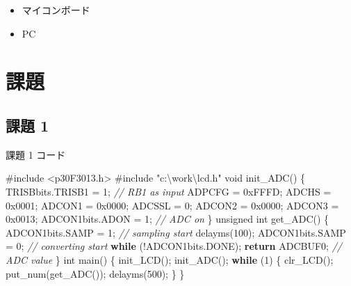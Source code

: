 \documentclass[9pt,a4paper,]{ltjsarticle}
\newenvironment{Shaded}{}{}
\newcommand{\BaseNTok}[1]{\textcolor[rgb]{0.25,0.63,0.44}{#1}}
\newcommand{\CommentTok}[1]{\textcolor[rgb]{0.38,0.63,0.69}{\textit{#1}}}
\newcommand{\ControlFlowTok}[1]{\textcolor[rgb]{0.00,0.44,0.13}{\textbf{#1}}}
\newcommand{\DataTypeTok}[1]{\textcolor[rgb]{0.56,0.13,0.00}{#1}}
\newcommand{\DecValTok}[1]{\textcolor[rgb]{0.25,0.63,0.44}{#1}}
\newcommand{\ImportTok}[1]{#1}
\newcommand{\NormalTok}[1]{#1}
\newcommand{\PreprocessorTok}[1]{\textcolor[rgb]{0.74,0.48,0.00}{#1}}
\providecommand{\tightlist}{%
  \setlength{\itemsep}{0pt}\setlength{\parskip}{0pt}}
\begin{document}
\begin{itemize}
\tightlist
\item
  マイコンボード
\item
  PC
\end{itemize}

\hypertarget{ux8ab2ux984c}{%
\section{課題}\label{ux8ab2ux984c}}

\hypertarget{ux8ab2ux984c-1}{%
\subsection{課題 1}\label{ux8ab2ux984c-1}}

\begin{codelisting}

\caption{課題 1 コード}

\hypertarget{lst:awesome-code}{%
\label{lst:awesome-code}}%
\begin{Shaded}
\begin{Highlighting}[numbers=left,,]
\PreprocessorTok{#include }\ImportTok{<p30F3013.h>}
\PreprocessorTok{#include }\ImportTok{"c:\textbackslash{}work\textbackslash{}lcd.h"}
\DataTypeTok{void}\NormalTok{ init_ADC() \{}
\NormalTok{  TRISBbits.TRISB1 = }\DecValTok{1}\NormalTok{;  }\CommentTok{// RB1 as input}
\NormalTok{  ADPCFG = }\BaseNTok{0xFFFD}\NormalTok{;}
\NormalTok{  ADCHS = }\BaseNTok{0x0001}\NormalTok{;}
\NormalTok{  ADCON1 = }\BaseNTok{0x0000}\NormalTok{;}
\NormalTok{  ADCSSL = }\DecValTok{0}\NormalTok{;}
\NormalTok{  ADCON2 = }\BaseNTok{0x0000}\NormalTok{;}
\NormalTok{  ADCON3 = }\BaseNTok{0x0013}\NormalTok{;}
\NormalTok{  ADCON1bits.ADON = }\DecValTok{1}\NormalTok{;  }\CommentTok{// ADC on}
\NormalTok{\}}
\DataTypeTok{unsigned} \DataTypeTok{int}\NormalTok{ get_ADC() \{}
\NormalTok{  ADCON1bits.SAMP = }\DecValTok{1}\NormalTok{;  }\CommentTok{// sampling start}
\NormalTok{  delayms(}\DecValTok{100}\NormalTok{);}
\NormalTok{  ADCON1bits.SAMP = }\DecValTok{0}\NormalTok{;  }\CommentTok{// converting start}
  \ControlFlowTok{while}\NormalTok{ (!ADCON1bits.DONE);}
  \ControlFlowTok{return}\NormalTok{ ADCBUF0;  }\CommentTok{// ADC value}
\NormalTok{\}}
\DataTypeTok{int}\NormalTok{ main() \{}
\NormalTok{  init_LCD();}
\NormalTok{  init_ADC();}
  \ControlFlowTok{while}\NormalTok{ (}\DecValTok{1}\NormalTok{) \{ clr_LCD();}
\NormalTok{    put_num(get_ADC());}
\NormalTok{    delayms(}\DecValTok{500}\NormalTok{);}
\NormalTok{  \}}
\NormalTok{\}}
\end{Highlighting}
\end{Shaded}

\end{codelisting}
\end{document}
